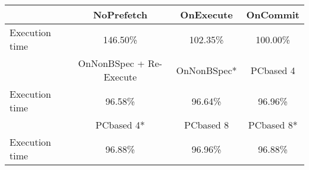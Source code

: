 \begin{tabular}{ l|ccc }
 & NoPrefetch & OnExecute & OnCommit\\ \hline
Execution time & 146.50\% & 102.35\% & 100.00\%\\ \hline
\hline
 & OnNonBSpec + Re-Execute & OnNonBSpec* & PCbased 4\\ \hline
Execution time & 96.58\% & 96.64\% & 96.96\%\\ \hline
\hline
 & PCbased 4* & PCbased 8 & PCbased 8*\\ \hline
Execution time & 96.88\% & 96.96\% & 96.88\%\\ \hline
\end{tabular}

